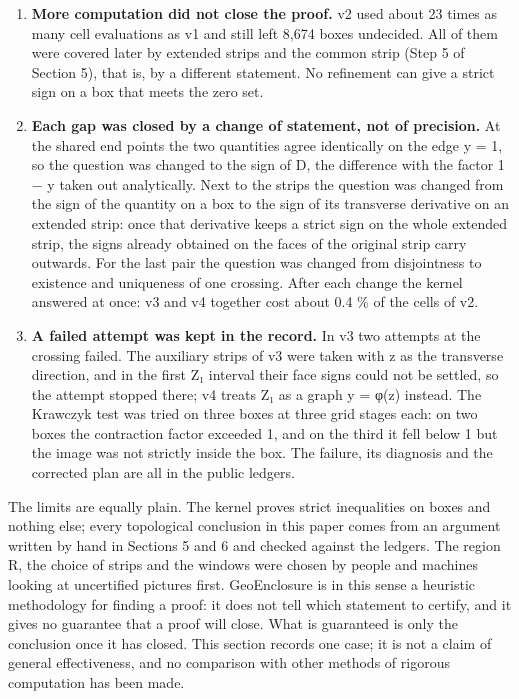 \documentclass[
  11pt,
]{article}
\providecommand{\tightlist}{%
  \setlength{\itemsep}{0pt}\setlength{\parskip}{0pt}}
\begin{document}
\begin{enumerate}
\def\labelenumi{\arabic{enumi}.}
\tightlist
\item
  \textbf{More computation did not close the proof.} v2 used about 23
  times as many cell evaluations as v1 and still left 8,674 boxes
  undecided. All of them were covered later by extended strips and the
  common strip (Step 5 of Section 5), that is, by a different statement.
  No refinement can give a strict sign on a box that meets the zero set.
\item
  \textbf{Each gap was closed by a change of statement, not of
  precision.} At the shared end points the two quantities agree
  identically on the edge y = 1, so the question was changed to the sign
  of D, the difference with the factor 1 − y taken out analytically.
  Next to the strips the question was changed from the sign of the
  quantity on a box to the sign of its transverse derivative on an
  extended strip: once that derivative keeps a strict sign on the whole
  extended strip, the signs already obtained on the faces of the
  original strip carry outwards. For the last pair the question was
  changed from disjointness to existence and uniqueness of one crossing.
  After each change the kernel answered at once: v3 and v4 together cost
  about 0.4 \% of the cells of v2.
\item
  \textbf{A failed attempt was kept in the record.} In v3 two attempts
  at the crossing failed. The auxiliary strips of v3 were taken with z
  as the transverse direction, and in the first Z₁ interval their face
  signs could not be settled, so the attempt stopped there; v4 treats Z₁
  as a graph y = φ(z) instead. The Krawczyk test was tried on three
  boxes at three grid stages each: on two boxes the contraction factor
  exceeded 1, and on the third it fell below 1 but the image was not
  strictly inside the box. The failure, its diagnosis and the corrected
  plan are all in the public ledgers.
\end{enumerate}

The limits are equally plain. The kernel proves strict inequalities on
boxes and nothing else; every topological conclusion in this paper comes
from an argument written by hand in Sections 5 and 6 and checked against
the ledgers. The region R, the choice of strips and the windows were
chosen by people and machines looking at uncertified pictures first.
GeoEnclosure is in this sense a heuristic methodology for finding a
proof: it does not tell which statement to certify, and it gives no
guarantee that a proof will close. What is guaranteed is only the
conclusion once it has closed. This section records one case; it is not
a claim of general effectiveness, and no comparison with other methods
of rigorous computation has been made.
\end{document}
